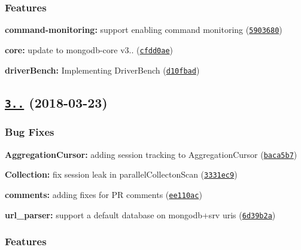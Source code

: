 \subsubsection*{Features}


\begin{DoxyItemize}
\item {\bfseries command-\/monitoring\+:} support enabling command monitoring (\href{https://github.com/mongodb/node-mongodb-native/commit/5903680}{\tt 5903680})
\item {\bfseries core\+:} update to mongodb-\/core v3.. (\href{https://github.com/mongodb/node-mongodb-native/commit/cfdd0ae}{\tt cfdd0ae})
\item {\bfseries driver\+Bench\+:} Implementing Driver\+Bench (\href{https://github.com/mongodb/node-mongodb-native/commit/d10fbad}{\tt d10fbad})
\end{DoxyItemize}

\label{_3.0.5}%
 \subsection*{\href{https://github.com/mongodb/node-mongodb-native/compare/v3.0.4...v3.0.5}{\tt 3..} (2018-\/03-\/23)}

\subsubsection*{Bug Fixes}


\begin{DoxyItemize}
\item {\bfseries Aggregation\+Cursor\+:} adding session tracking to Aggregation\+Cursor (\href{https://github.com/mongodb/node-mongodb-native/commit/baca5b7}{\tt baca5b7})
\item {\bfseries Collection\+:} fix session leak in parallel\+Collecton\+Scan (\href{https://github.com/mongodb/node-mongodb-native/commit/3331ec9}{\tt 3331ec9})
\item {\bfseries comments\+:} adding fixes for PR comments (\href{https://github.com/mongodb/node-mongodb-native/commit/ee110ac}{\tt ee110ac})
\item {\bfseries url\+\_\+parser\+:} support a default database on mongodb+srv uris (\href{https://github.com/mongodb/node-mongodb-native/commit/6d39b2a}{\tt 6d39b2a})
\end{DoxyItemize}

\subsubsection*{Features}


